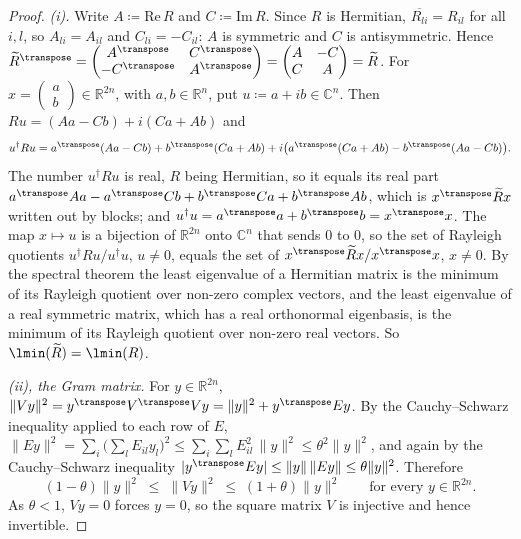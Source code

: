 \begin{proof}
\emph{(i).} Write $A\coloneqq\mathrm{Re}\,R$ and $C\coloneqq\mathrm{Im}\,R$.
Since $R$ is Hermitian, $\overline{R_{li}}=R_{il}$ for all $i,l$, so
$A_{li}=A_{il}$ and $C_{li}=-C_{il}$: $A$ is symmetric and $C$ is
antisymmetric. Hence
$\widetilde R^{\transpose}=\begin{pmatrix}A^{\transpose}&C^{\transpose}\\
-C^{\transpose}&A^{\transpose}\end{pmatrix}
=\begin{pmatrix}A&-C\\C&A\end{pmatrix}=\widetilde R$. For
$x=\begin{pmatrix}a\\b\end{pmatrix}\in\mathbb{R}^{2n}$, with
$a,b\in\mathbb{R}^{n}$, put $u\coloneqq a+ib\in\mathbb{C}^{n}$. Then
$Ru=(Aa-Cb)+i(Ca+Ab)$ and
\begin{equation*}
  u^{\dagger}Ru
  =a^{\transpose}(Aa-Cb)+b^{\transpose}(Ca+Ab)
  +i\big(a^{\transpose}(Ca+Ab)-b^{\transpose}(Aa-Cb)\big).
\end{equation*}
The number $u^{\dagger}Ru$ is real, $R$ being Hermitian, so it equals its
real part
$a^{\transpose}Aa-a^{\transpose}Cb+b^{\transpose}Ca+b^{\transpose}Ab$, which
is $x^{\transpose}\widetilde Rx$ written out by blocks; and
$u^{\dagger}u=a^{\transpose}a+b^{\transpose}b=x^{\transpose}x$. The map
$x\mapsto u$ is a bijection of $\mathbb{R}^{2n}$ onto $\mathbb{C}^{n}$ that
sends $0$ to $0$, so the set of Rayleigh quotients
$u^{\dagger}Ru/u^{\dagger}u$, $u\ne0$, equals the set of
$x^{\transpose}\widetilde Rx/x^{\transpose}x$, $x\ne0$. By the spectral
theorem the least eigenvalue of a Hermitian matrix is the minimum of its
Rayleigh quotient over non-zero complex vectors, and the least eigenvalue of
a real symmetric matrix, which has a real orthonormal eigenbasis, is the
minimum of its Rayleigh quotient over non-zero real vectors. So
$\lmin(\widetilde R)=\lmin(R)$.

\emph{(ii), the Gram matrix.} For $y\in\mathbb{R}^{2n}$,
$\|Vy\|^{2}=y^{\transpose}V^{\transpose}Vy=\|y\|^{2}+y^{\transpose}Ey$.
By the Cauchy--Schwarz inequality applied to each row of $E$,
$\|Ey\|^{2}=\sum_i\big(\sum_lE_{il}y_l\big)^{2}
\le\sum_i\sum_lE_{il}^{2}\,\|y\|^{2}\le\theta^{2}\|y\|^{2}$, and again by
the Cauchy--Schwarz inequality $|y^{\transpose}Ey|\le\|y\|\,\|Ey\|
\le\theta\|y\|^{2}$. Therefore
\begin{equation}\label{eq:gram-sandwich}
  (1-\theta)\|y\|^{2}\;\le\;\|Vy\|^{2}\;\le\;(1+\theta)\|y\|^{2}
  \qquad\text{for every }y\in\mathbb{R}^{2n}.
\end{equation}
As $\theta<1$, $Vy=0$ forces $y=0$, so the square matrix $V$ is injective
and hence invertible.


\end{proof}
